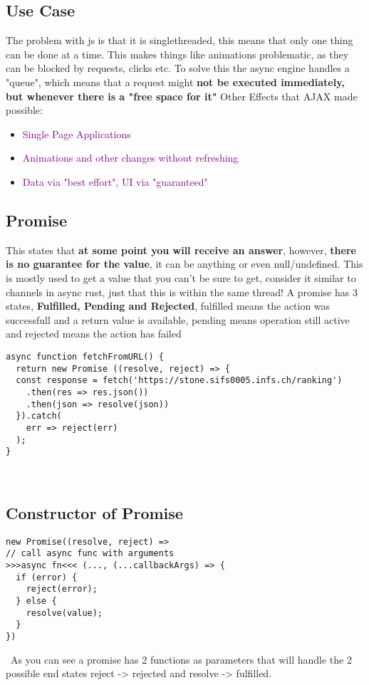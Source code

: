 \documentclass[main.tex,fontsize=6pt,paper=a4,paper=landscape,DIV=calc,]{scrartcl}
\begin{document}
\begin{multicols*}{4}
\subsection{Use Case}  
The problem with js is that it is singlethreaded, this means that only one thing can be done at a time.\newline
This makes things like animations problematic, as they can be blocked by requests, clicks etc.\newline
To solve this the async engine handles a "queue", which means that a request might \textbf{not be executed immediately, but whenever there is a "free space for it"}\newline
Other Effects that AJAX made possible:
\begin{itemize}
\item \textcolor{purple}{Single Page Applications}
\item \textcolor{purple}{Animations and other changes without refreshing}
\item \textcolor{purple}{Data via "best effort", UI via "guaranteed"}
\end{itemize} 

\subsection{Promise}  
This states that \textbf{at some point you will receive an answer}, however, \textbf{there is no guarantee for the value}, it can be anything or even null/undefined.\newline
This is mostly used to get a value that you can't be sure to get, consider it similar to channels in async rust, just that this is within the same thread!\newline
\textcolor{OliveGreen}{A promise has 3 states, \textbf{Fulfilled, Pending and Rejected}, fulfilled means the action was successfull and a return value is available, pending means operation still active and rejected means the action has failed}
\begin{lstlisting}
async function fetchFromURL() {
  return new Promise ((resolve, reject) => {
  const response = fetch('https://stone.sifs0005.infs.ch/ranking')
    .then(res => res.json())
    .then(json => resolve(json))
  }).catch(
    err => reject(err)
  );
}
\end{lstlisting}
\, \newline

\subsection{Constructor of Promise}  
\begin{lstlisting}
new Promise((resolve, reject) =>
// call async func with arguments
>>>async fn<<< (..., (...callbackArgs) => {
  if (error) {
    reject(error);
  } else {
    resolve(value);
  }
})
\end{lstlisting}
\, \newline
As you can see a promise has 2 functions as parameters that will handle the 2 possible end states reject -> rejected and resolve -> fulfilled.


\end{multicols*}
\end{document}
